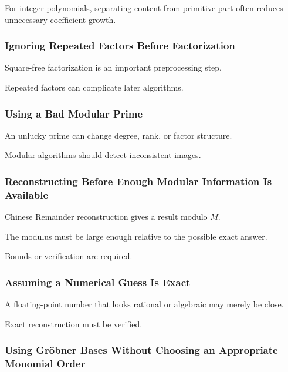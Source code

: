 For integer polynomials, separating content from primitive part often
reduces unnecessary coefficient growth.

\subsubsection{Ignoring Repeated Factors Before Factorization}

Square-free factorization is an important preprocessing step.

Repeated factors can complicate later algorithms.

\subsubsection{Using a Bad Modular Prime}

An unlucky prime can change degree, rank, or factor structure.

Modular algorithms should detect inconsistent images.

\subsubsection{Reconstructing Before Enough Modular Information Is Available}

Chinese Remainder reconstruction gives a result modulo \(M\).

The modulus must be large enough relative to the possible exact answer.

Bounds or verification are required.

\subsubsection{Assuming a Numerical Guess Is Exact}

A floating-point number that looks rational or algebraic may merely be
close.

Exact reconstruction must be verified.

\subsubsection{Using Gröbner Bases Without Choosing an Appropriate Monomial Order}

